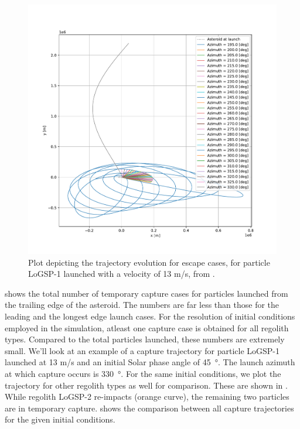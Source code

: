 \begin{figure}[htb]
\centering
\captionsetup{justification=centering}
\includegraphics[width=\textwidth, height=0.4\textheight, keepaspectratio=true]{trailing_edge_perturbations/logsp1_escape_traj_13ms_solarPhase225.pdf}
\caption{Plot depicting the trajectory evolution for escape cases, for particle LoGSP-1 launched with a velocity of 13 m/s, from \protect{}.}
\label{fig:trailingEdge_logsp1_escape_traj_13ms_solar225}
\end{figure}
\FloatBarrier
 shows the total number of temporary capture cases for particles launched from the trailing edge of the asteroid. The numbers are far less than those for the leading and the longest edge launch cases. For the resolution of initial conditions employed in the simulation, atleast one capture case is obtained for all regolith types. Compared to the total particles launched, these numbers are extremely small. We'll look at an example of a capture trajectory for particle LoGSP-1 launched at 13 m/s and an initial Solar phase angle of \SI{45}{\degree}. The launch azimuth at which capture occurs is \SI{330}{\degree}. For the same initial conditions, we plot the trajectory for other regolith types as well for comparison. These are shown in . While regolith LoGSP-2 re-impacts (orange curve), the remaining two particles are in temporary capture.  shows the comparison between all capture trajectories for the given initial conditions.
